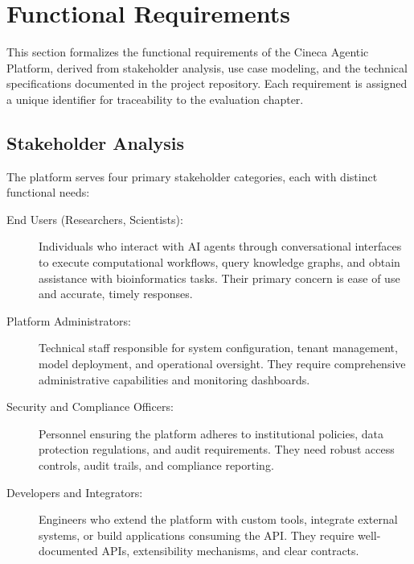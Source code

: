
\section{Functional Requirements}
\label{sec:functional-requirements}

This section formalizes the functional requirements of the Cineca Agentic Platform, derived from stakeholder analysis, use case modeling, and the technical specifications documented in the project repository. Each requirement is assigned a unique identifier for traceability to the evaluation chapter.

\subsection{Stakeholder Analysis}
\label{subsec:stakeholders}

The platform serves four primary stakeholder categories, each with distinct functional needs:

\begin{description}
    \item[End Users (Researchers, Scientists):] Individuals who interact with AI agents through conversational interfaces to execute computational workflows, query knowledge graphs, and obtain assistance with bioinformatics tasks. Their primary concern is ease of use and accurate, timely responses.
    
    \item[Platform Administrators:] Technical staff responsible for system configuration, tenant management, model deployment, and operational oversight. They require comprehensive administrative capabilities and monitoring dashboards.
    
    \item[Security and Compliance Officers:] Personnel ensuring the platform adheres to institutional policies, data protection regulations, and audit requirements. They need robust access controls, audit trails, and compliance reporting.
    
    \item[Developers and Integrators:] Engineers who extend the platform with custom tools, integrate external systems, or build applications consuming the API. They require well-documented APIs, extensibility mechanisms, and clear contracts.
\end{description}

